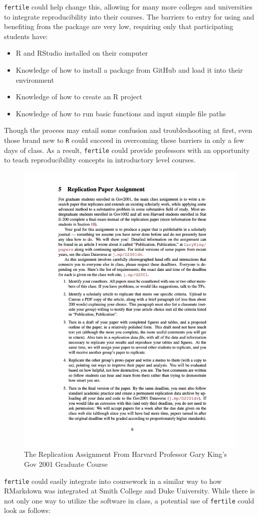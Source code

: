 \documentclass[12pt,twoside]{reedthesis}
\providecommand{\tightlist}{%
  \setlength{\itemsep}{0pt}\setlength{\parskip}{0pt}}
\begin{document}
\texttt{fertile} could help change this, allowing for many more colleges and universities to integrate reproducibility into their courses. The barriers to entry for using and benefiting from the package are very low, requiring only that participating students have:
\begin{itemize}
\tightlist
\item
  R and RStudio installed on their computer
\item
  Knowledge of how to install a package from GitHub and load it into their environment
\item
  Knowledge of how to create an R project
\item
  Knowledge of how to run basic functions and input simple file paths
\end{itemize}
Though the process may entail some confusion and troubleshooting at first, even those brand new to \texttt{R} could succeed in overcoming these barriers in only a few days of class. As a result, \texttt{fertile} could provide professors with an opportunity to teach reproducibility concepts in introductory level courses.
\begin{figure}
\includegraphics[width=1\linewidth]{figure/gov-2001-replication} \caption{The Replication Assignment From Harvard Professor Gary King's Gov 2001 Graduate Course}\label{fig:unnamed-chunk-73}
\end{figure}
\texttt{fertile} could easily integrate into coursework in a similar way to how RMarkdown was integrated at Smith College and Duke University. While there is not only one way to utilize the software in class, a potential use of \texttt{fertile} could look as follows:
\end{document}
